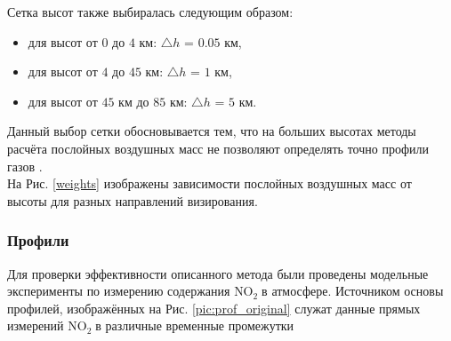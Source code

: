 \documentclass[a4paper,14pt]{article}
\theoremstyle{plain}
\theoremstyle{definition}
\theoremstyle{remark}
\newcommand{\nl}{\\ \indent}
\newcommand{\no}{$\text{NO}_2 \;$}
\begin{document}
Сетка высот  также выбиралась следующим образом:
\begin{itemize}
\item для высот от $0$ до $4$ км: $\triangle h$ = $0.05$ км,
\item для высот от $4$ до $45$ км: $\triangle h$ = $1$ км, 
\item для высот от $45$ км до $85$ км: $\triangle h$ = $5$ км. 
\end{itemize}
Данный выбор сетки обосновывается тем, что на больших высотах
методы расчёта послойных воздушных масс не позволяют определять
точно профили газов \cite{litlink3}. 
\nl
На Рис. \ref{weights} изображены зависимости послойных воздушных 
масс от высоты для разных направлений визирования.
\nl
\subsubsection{Профили}
Для проверки эффективности описанного метода были проведены
модельные эксперименты по измерению содержания \no  в 
атмосфере. 
Источником основы профилей, изображённых на 
Рис. \ref{pic:prof_original} служат данные прямых измерений
\no в различные временные промежутки \cite{litlink4}
\begin{figure}[bh]
\noindent{}
\end{figure}
\end{document}
